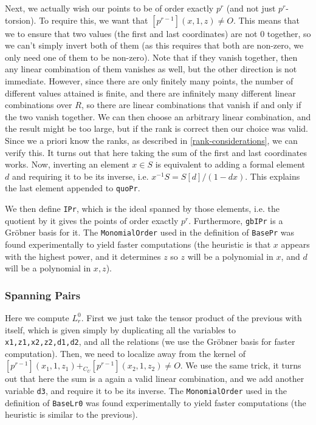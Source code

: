 Next, we actually wish our points to be of order exactly $p^r$ (and not just $p^r$-torsion).
To require this, we want that $\left[p^{r-1}\right]\left(x,1,z\right) \neq O$.
This means that we to ensure that two values (the first and last coordinates) are not $0$ together, so we can't simply invert both of them (as this requires that both are non-zero, we only need one of them to be non-zero).
Note that if they vanish together, then any linear combination of them vanishes as well, but the other direction is not immediate.
However, since there are only finitely many points, the number of different values attained is finite, and there are infinitely many different linear combinations over $R$, so there are linear combinations that vanish if and only if the two vanish together.
We can then choose an arbitrary linear combination, and the result might be too large, but if the rank is correct then our choice was valid.
Since we a priori know the ranks, as described in \cref{rank-considerations}, we can verify this.
It turns out that here taking the sum of the first and last coordinates works.
Now, inverting an element $x \in S$ is equivalent to adding a formal element $d$ and requiring it to be its inverse, i.e. $x^{-1} S = S\left[d\right]/(1 - dx)$.
This explains the last element appended to \texttt{quoPr}.

We then define \texttt{IPr}, which is the ideal spanned by those elements, i.e. the quotient by it gives the points of order exactly $p^r$.
Furthermore, \texttt{gbIPr} is a Gr\"{o}bner basis for it.
The \texttt{MonomialOrder} used in the definition of \texttt{BasePr} was found experimentally to yield faster computations (the heuristic is that $x$ appears with the highest power, and it determines $z$ so $z$ will be a polynomial in $x$, and $d$ will be a polynomial in $x,z$).

\subsubsection{Spanning Pairs}

Here we compute $L_r^0$.
First we just take the tensor product of the previous with itself, which is given simply by duplicating all the variables to \texttt{x1,z1,x2,z2,d1,d2}, and all the relations (we use the Gr\"{o}bner basis for faster computation).
Then, we need to localize away from the kernel of $\left[p^{r-1}\right]\left(x_1,1,z_1\right) +_{C_U} \left[p^{r-1}\right]\left(x_2,1,z_2\right) \neq O$.
We use the same trick, it turns out that here the sum is a again a valid linear combination, and we add another variable \texttt{d3}, and require it to be its inverse.
The \texttt{MonomialOrder} used in the definition of \texttt{BaseLr0} was found experimentally to yield faster computations (the heuristic is similar to the previous).

